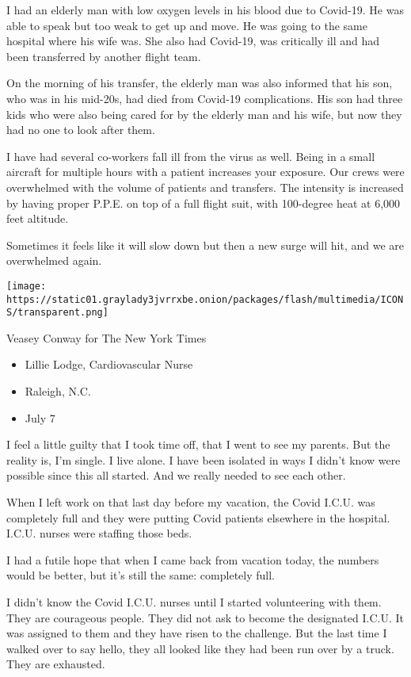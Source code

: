 I had an elderly man with low oxygen levels in his blood due to
Covid-19. He was able to speak but too weak to get up and move. He was
going to the same hospital where his wife was. She also had Covid-19,
was critically ill and had been transferred by another flight team.

On the morning of his transfer, the elderly man was also informed that
his son, who was in his mid-20s, had died from Covid-19 complications.
His son had three kids who were also being cared for by the elderly man
and his wife, but now they had no one to look after them.

I have had several co-workers fall ill from the virus as well. Being in
a small aircraft for multiple hours with a patient increases your
exposure. Our crews were overwhelmed with the volume of patients and
transfers. The intensity is increased by having proper P.P.E. on top of
a full flight suit, with 100-degree heat at 6,000 feet altitude.

Sometimes it feels like it will slow down but then a new surge will hit,
and we are overwhelmed again.

\texttt{[image: https://static01.graylady3jvrrxbe.onion/packages/flash/multimedia/ICONS/transparent.png]}

Veasey Conway for The New York Times

\begin{itemize}
\tightlist
\item
  Lillie Lodge, Cardiovascular Nurse
\item
  Raleigh, N.C.
\item
  July 7
\end{itemize}

I feel a little guilty that I took time off, that I went to see my
parents. But the reality is, I'm single. I live alone. I have been
isolated in ways I didn't know were possible since this all started. And
we really needed to see each other.

When I left work on that last day before my vacation, the Covid I.C.U.
was completely full and they were putting Covid patients elsewhere in
the hospital. I.C.U. nurses were staffing those beds.

I had a futile hope that when I came back from vacation today, the
numbers would be better, but it's still the same: completely full.

I didn't know the Covid I.C.U. nurses until I started volunteering with
them. They are courageous people. They did not ask to become the
designated I.C.U. It was assigned to them and they have risen to the
challenge. But the last time I walked over to say hello, they all looked
like they had been run over by a truck. They are exhausted.

